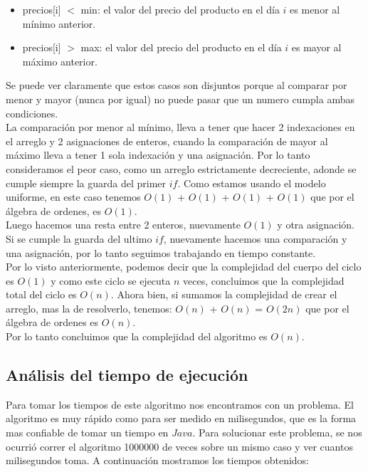 \begin{itemize}
 \item precios[i] $<$ min: el valor del precio del producto en el día $i$ es menor al mínimo anterior.
 \item precios[i] $>$ max: el valor del precio del producto en el día $i$ es mayor al máximo anterior.
\end{itemize}

\indent Se puede ver claramente que estos casos son disjuntos porque al comparar por menor y mayor (nunca por igual) no puede pasar que un numero cumpla ambas condiciones.\\
\indent La comparación por menor al mínimo, lleva a tener que hacer 2 indexaciones en el arreglo y 2 asignaciones de enteros, cuando la comparación de mayor al máximo lleva a tener 1 sola indexación y una asignación. Por lo tanto consideramos el peor caso, como un arreglo estrictamente decreciente, adonde se cumple siempre la guarda del primer $if$. Como estamos usando el modelo uniforme, en este caso tenemos $O(1)$ + $O(1)$ + $O(1)$ + $O(1)$ que por el álgebra de ordenes, es $O(1)$. \\                                                   
\indent Luego hacemos una resta entre 2 enteros, nuevamente $O(1)$ y otra asignación. Si se cumple la guarda del ultimo $if$, nuevamente hacemos una comparación y una asignación, por lo tanto seguimos trabajando en tiempo constante.\\
\indent Por lo visto anteriormente, podemos decir que la complejidad del cuerpo del ciclo es $O(1)$ y como este ciclo se ejecuta $n$ veces, concluimos que la complejidad total del ciclo es $O(n)$. Ahora bien, si sumamos la complejidad de crear el arreglo, mas la de resolverlo, tenemos: $O(n)$ + $O(n)$ = $O(2n)$ que por el álgebra de ordenes es $O(n)$.\\
\indent Por lo tanto concluimos que la complejidad del algoritmo es $O(n)$.\\

\clearpage

\subsection{Análisis del tiempo de ejecución}

\indent Para tomar los tiempos de este algoritmo nos encontramos con un problema. El algoritmo es muy rápido como para ser medido en milisegundos, que es la forma mas confiable de tomar un tiempo en $Java$. Para solucionar este problema, se nos ocurrió correr el algoritmo 1000000 de veces sobre un mismo caso y ver cuantos milisegundos toma. A continuación mostramos los tiempos obtenidos:\\

